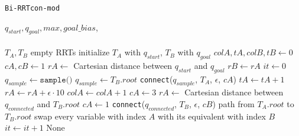\documentclass{article}
\begin{document}
\begin{algorithm}
\caption{\texttt{Bi-RRTcon-mod}}\label{alg:birrt}
\begin{algorithmic}
\Require $q_{\textit{start}} , q_{\textit{goal}}, max, goal\_bias$, \epsilon\\ \\
\State $T_A, T_B$ empty RRTs
\State initialize $T_A$ with $q_{\textit{start}}$, $T_B$ with $q_{\textit{goal}}$
\State $colA, tA, colB, tB \gets 0$
\State $cA, cB \gets 1$
\State $rA \gets$ Cartesian distance between $q_{\textit{start}}$ and $q_{\textit{goal}}$
\State $rB \gets rA$
\State $it \gets 0$
    \Do
        \State $q_{\textit{sample}} \gets \texttt{sample()}$
\Else
    \State $q_{\textit{sample}} \gets T_B.root$
\EndIf
\State \texttt{connect}($q_{\textit{sample}}$, $T_A$, $\epsilon$, $cA$)
\State $tA \gets tA + 1$
    \State $rA \gets rA + \epsilon \cdot 10$
    \State $colA \gets colA + 1$
    \State $cA \gets 3$
    \State $rA \gets$ Cartesian distance between $q_{\textit{connected}}$ and $T_B.root$
    \State $cA \gets 1$
    \State \texttt{connect}($q_{\textit{connected}}$, $T_B$, $\epsilon$, $cB$)
        \State \Return path from $T_A.root$ to $T_B.root$
    \EndIf
\EndIf
{}
    \State swap every variable with index $A$ with its equivalent with index $B$
\EndIf
\State $it \gets it + 1$
\EndWhile
\State \Return None
\end{algorithmic}
\end{algorithm}



\end{document}

